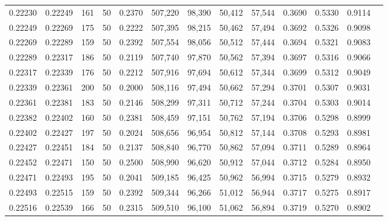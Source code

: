 \begin{tabular}{rrrrrrrrrrrrr}
0.22230 & 0.22249 &   161 &  50 &                                     0.2370 & 507,220 &  98,390 &  50,412 &  57,544 & 0.3690 & 0.5330 & 0.9114 \\
0.22249 & 0.22269 &   175 &  50 &                                     0.2222 & 507,395 &  98,215 &  50,462 &  57,494 & 0.3692 & 0.5326 & 0.9098 \\
0.22269 & 0.22289 &   159 &  50 &                                     0.2392 & 507,554 &  98,056 &  50,512 &  57,444 & 0.3694 & 0.5321 & 0.9083 \\
0.22289 & 0.22317 &   186 &  50 &                                     0.2119 & 507,740 &  97,870 &  50,562 &  57,394 & 0.3697 & 0.5316 & 0.9066 \\
0.22317 & 0.22339 &   176 &  50 &                                     0.2212 & 507,916 &  97,694 &  50,612 &  57,344 & 0.3699 & 0.5312 & 0.9049 \\
0.22339 & 0.22361 &   200 &  50 &                                     0.2000 & 508,116 &  97,494 &  50,662 &  57,294 & 0.3701 & 0.5307 & 0.9031 \\
0.22361 & 0.22381 &   183 &  50 &                                     0.2146 & 508,299 &  97,311 &  50,712 &  57,244 & 0.3704 & 0.5303 & 0.9014 \\
0.22382 & 0.22402 &   160 &  50 &                                     0.2381 & 508,459 &  97,151 &  50,762 &  57,194 & 0.3706 & 0.5298 & 0.8999 \\
0.22402 & 0.22427 &   197 &  50 &                                     0.2024 & 508,656 &  96,954 &  50,812 &  57,144 & 0.3708 & 0.5293 & 0.8981 \\
0.22427 & 0.22451 &   184 &  50 &                                     0.2137 & 508,840 &  96,770 &  50,862 &  57,094 & 0.3711 & 0.5289 & 0.8964 \\
0.22452 & 0.22471 &   150 &  50 &                                     0.2500 & 508,990 &  96,620 &  50,912 &  57,044 & 0.3712 & 0.5284 & 0.8950 \\
0.22471 & 0.22493 &   195 &  50 &                                     0.2041 & 509,185 &  96,425 &  50,962 &  56,994 & 0.3715 & 0.5279 & 0.8932 \\
0.22493 & 0.22515 &   159 &  50 &                                     0.2392 & 509,344 &  96,266 &  51,012 &  56,944 & 0.3717 & 0.5275 & 0.8917 \\
0.22516 & 0.22539 &   166 &  50 &                                     0.2315 & 509,510 &  96,100 &  51,062 &  56,894 & 0.3719 & 0.5270 & 0.8902 \\

\end{tabular}
